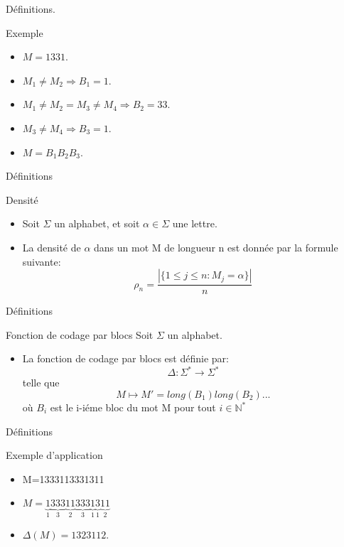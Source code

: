 \documentclass[12pt]{beamer}
\begin{document}
\begin{frame}{Définitions.}
  \begin{block}{Exemple}
    \begin{itemize}
    \item $M=1331$.
    \item<alert@1-> $M_1 \neq M_2 \Rightarrow B_1=1$.  
    \item<alert@1->
     $M_1 \neq M_2=M_3 \neq M_4 \Rightarrow B_2=33$.
    \item<alert@1-> $M_3 \neq M_4 \Rightarrow B_3=1$.
    \item $M=B_1B_2B_3$.
     \end{itemize}
  \end{block}
  \end{frame}
\begin{frame}[t]{Définitions}
  \begin{block}{Densité}
    \begin{itemize}
    \item<alert@1->
      Soit $\Sigma$ un alphabet, et soit $\alpha \in \Sigma$ une lettre.
    \item La densité de $\alpha$ dans un mot M de longueur n est donnée par la formule suivante: 
 $$\rho_n = \frac{|\{ 1 \leq j \leq n : M_j =\alpha \} |}{n}$$
    \end{itemize}
  \end{block}
\end{frame}
\begin{frame}[t]{Définitions}
  \begin{block}{Fonction de codage par blocs}
   Soit $\Sigma$ un alphabet.
    \begin{itemize}
    \item  La fonction de codage par blocs est définie par:   
     $$\Delta: \Sigma^* \longrightarrow \Sigma^* $$ telle que $$M \longmapsto M'=long(B_1)long(B_2)...$$ 
où  $B_i$    est le i-iéme bloc du mot M pour tout $i\in \mathbb{N}^*$
     \end{itemize}
  \end{block}
\end{frame}
\begin{frame}[t]{Définitions}
   \begin{block}{Exemple d'application}
    \begin{itemize}
    \item  M=1333113331311
    \item $M=\underset{1}{\underbrace{1}} \underset{3}{\underbrace{333}} \underset{2}{\underbrace{11}} \underset{3}{\underbrace{333}} \underset{1}{\underbrace{1}} \underset{1}{\underbrace{3}} \underset{2}{\underbrace{11}}$
    \item<alert@1->
    $\Delta(M)=1323112$.
  \end{itemize}
  \end{block}
\end{frame}
\end{document}
